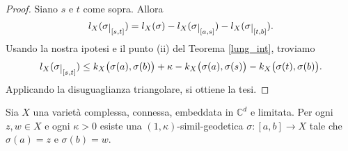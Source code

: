 \begin{proof}
    Siano $s$ e $t$ come sopra. Allora
    $$l_X(\sigma\restrict{[s,t]})=l_X(\sigma)-l_X(\sigma\restrict{[a,s]})-l_X(\sigma\restrict{[t,b]}).$$
    Usando la nostra ipotesi e il punto (ii) del Teorema \ref{lung_int}, troviamo
    $$l_X(\sigma\restrict{[s,t]}) \le k_X\big(\sigma(a),\sigma(b)\big)+\kappa-k_X\big(\sigma(a),\sigma(s)\big)-k_X\big(\sigma(t),\sigma(b)\big).$$
    Applicando la disuguaglianza triangolare, si ottiene la tesi.
\end{proof}

\begin{thm} \label{similgeo_conn}
    Sia $X$ una varietà complessa, connessa, embeddata in $\mathbb{C}^d$ e limitata. Per ogni $z,w \in X$ e ogni $\kappa>0$ esiste una $(1,\kappa)$-simil-geodetica $\sigma:[a,b]\longrightarrow X$ tale che $\sigma(a)=z$ e $\sigma(b)=w$.
\end{thm}

